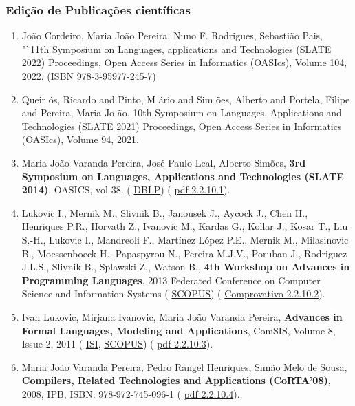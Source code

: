 \documentclass[11pt]{article}
\begin{document}
\subsubsection{Edição de Publicações científicas}
\begin{enumerate}
\item{João Cordeiro, Maria João Pereira, Nuno F. Rodrigues, Sebastião Pais, "`11th Symposium on Languages, applications and Technologies (SLATE 2022) Proceedings, Open Access Series in Informatics (OASIcs), Volume 104, 2022. (ISBN 978-3-95977-245-7)}
\item{Queir
\'{o}s, Ricardo and Pinto, M
\'{a}rio and Sim
\~{o}es, Alberto and Portela, Filipe and Pereira, Maria Jo
\~{a}o, 10th Symposium on Languages, Applications and Technologies (SLATE 2021) Proceedings, Open Access Series in Informatics (OASIcs), Volume 94, 2021.}
\item{Maria João Varanda Pereira, José Paulo Leal, Alberto Simões, {
\bf{ 3rd Symposium on Languages, Applications and Technologies (SLATE 2014)}}, OASICS, vol 38. (
\href{run:Publicacoes/ComprovativosDBLP.pdf}{DBLP}) (
\href{run:Publicacoes/PROCslate2014.pdf}{pdf 2.2.10.1}).}
\item{Lukovic I., Mernik M., Slivnik B., Janousek J., Aycock J., Chen H., Henriques P.R., Horvath Z., Ivanovic M., Kardas G., Kollar J., Kosar T., Liu S.-H., Lukovic I., Mandreoli F., Martínez López P.E., Mernik M., Milasinovic B., Moessenboeck H., Papaspyrou N., Pereira M.J.V., Poruban J., Rodriguez J.L.S., Slivnik B., Splawski Z., Watson B., {
\bf{ 4th Workshop on Advances in Programming Languages}}, 2013 Federated Conference on Computer Science and Information Systems (
\href{run:Publicacoes/PublicacoesSCOPUS.pdf}{SCOPUS}) (
\href{run:OutrasActCientif/EDWAPL2013.pdf}{Comprovativo 2.2.10.2}).}
\item{Ivan Lukovic, Mirjana Ivanovic, Maria João Varanda Pereira, {
\bf{ Advances in Formal Languages, Modeling and Applications}}, ComSIS, Volume 8, Issue 2, 2011 (
\href{run:Publicacoes/ComprovativosISI.pdf}{ISI},
\href{run:Publicacoes/PublicacoesSCOPUS.pdf}{SCOPUS}) (
\href{run:Publicacoes/ComSIS0802.pdf}{pdf 2.2.10.3}).}
\item{Maria João Varanda Pereira, Pedro Rangel Henriques, Simão Melo de Sousa, {
\bf{ Compilers, Related Technologies and Applications (CoRTA'08)}}, 2008, IPB, ISBN: 978-972-745-096-1 (
\href{run:Publicacoes/ActasCORTA08VFR.pdf}{pdf 2.2.10.4}).}
\end{enumerate}
\end{document}
